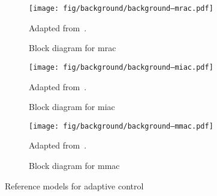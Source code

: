 \begin{figure}[p]
	\centering
	\begin{subfigure}[b]{0.6\linewidth}
		\centering
		\texttt{[image: fig/background/background--mrac.pdf]}
		\caption{Block diagram for \gls{mrac}}
		\label{fig:background--ct-mrac}
		Adapted from~\cite{astrom-2013-adaptive}.
		\vspace{3em}
	\end{subfigure}
	\begin{subfigure}[b]{0.6\linewidth}
		\centering
		\texttt{[image: fig/background/background--miac.pdf]}
		\caption{Block diagram for \gls{miac}}
		\label{fig:background--ct-miac}
		Adapted from~\cite{muller-2014-highly}.
		\vspace{3em}
	\end{subfigure}
	\begin{subfigure}[b]{0.6\linewidth}
		\centering
		\texttt{[image: fig/background/background--mmac.pdf]}
		\caption{Block diagram for \gls{mmac}}
		\label{fig:background--ct-mmac}
		Adapted from~\cite{landau-2011-multimodel}.
	\end{subfigure}
	\caption{Reference models for adaptive control}
	\label{fig:background--ct-adaptive-control-all}
\end{figure}

